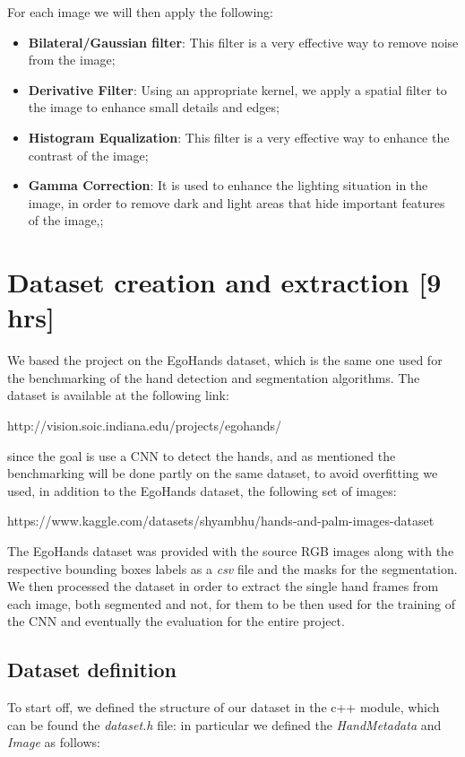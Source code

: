 For each image we will then apply the following:
\begin{itemize}
    \item \textbf{Bilateral/Gaussian filter}: This filter is a very effective
          way to remove noise from the image;
    \item \textbf{Derivative Filter}: Using an appropriate kernel, we apply a
          spatial filter to the image to enhance small details and edges;
    \item \textbf{Histogram Equalization}: This filter is a very effective way
          to enhance the contrast of the image;
    \item \textbf{Gamma Correction}: It is used to enhance the lighting
          situation in the image, in order to remove dark and light areas that
          hide
          important features of the image,;
\end{itemize}

\section{Dataset creation and extraction [9 hrs]}
We based the project on the EgoHands dataset, which is the same one used for
the benchmarking of the hand detection and segmentation algorithms. The dataset
is available at the following link:

http://vision.soic.indiana.edu/projects/egohands/

since the goal is use a CNN to detect the hands, and as mentioned the
benchmarking will be done partly on the same dataset, to avoid overfitting we
used, in addition to the EgoHands dataset,
the following set of images:

https://www.kaggle.com/datasets/shyambhu/hands-and-palm-images-dataset

The EgoHands dataset was provided with the source RGB images along with the
respective bounding boxes labels as a \textit{csv} file and the masks for the
segmentation. We then processed
the dataset in order to extract the single hand frames from each image, both
segmented and not, for them to be then used for the training of the CNN and
eventually the evaluation for the entire
project.

\subsection{Dataset definition}

To start off, we defined the structure of our dataset in the c++ module, which
can be found the \textit{dataset.h} file: in particular we defined the
\textit{HandMetadata} and \textit{Image}
as follows:

